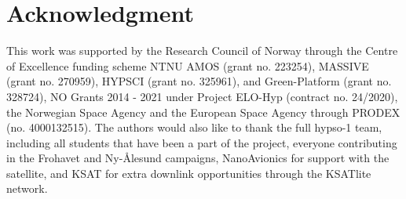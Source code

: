 \section*{Acknowledgment}



This work was supported by the Research Council of Norway through the Centre of Excellence funding scheme NTNU AMOS (grant no. 223254),  MASSIVE (grant no. 270959),  HYPSCI (grant no. 325961), and Green-Platform (grant no. 328724), NO Grants 2014 - 2021 under Project ELO-Hyp (contract no. 24/2020), the Norwegian Space Agency and the European Space Agency through PRODEX (no. 4000132515).
%
The authors would also like to thank the full \gls{hypso}-1 team, including all students that have been a part of the project, everyone contributing in the Frohavet and Ny-Ålesund campaigns, NanoAvionics for support with the satellite, and KSAT for extra downlink opportunities through the KSATlite network.